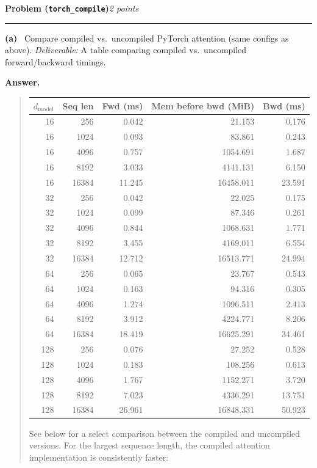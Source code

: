 \documentclass[11pt]{article}
\newcommand{\problem}[2]{%
  \vspace{0.6em}%
  \noindent\textbf{Problem (\texttt{#1})}\hfill\textit{#2 points}\par%
  \vspace{0.2em}\hrule\vspace{0.4em}%
}
\newcommand{\subq}[1]{\vspace{0.3em}\noindent\textbf{(#1)}\ }
\newcommand{\deliverable}[1]{\vspace{0.2em}\noindent\textit{Deliverable:} #1\par}
\newenvironment{answer}{%
  \vspace{0.3em}%
  \noindent\textbf{Answer.}\begin{quote}%
}{%
  \end{quote}\vspace{0.4em}%
}
\begin{document}
\problem{torch\_compile}{2}

\subq{a} Compare compiled vs.\ uncompiled PyTorch attention (same configs as above).
\deliverable{A table comparing compiled vs.\ uncompiled forward/backward timings.}
\begin{answer}
  \begin{center}
  \small
  \begin{tabular}{rrrrr}
    \toprule
    $d_{\text{model}}$ & Seq len & Fwd (ms) & Mem before bwd (MiB) & Bwd (ms) \\
    \midrule
    16 & 256 & 0.042 & 21.153 & 0.176 \\
    16 & 1024 & 0.093 & 83.861 & 0.243 \\
    16 & 4096 & 0.757 & 1054.691 & 1.687 \\
    16 & 8192 & 3.033 & 4141.131 & 6.150 \\
    16 & 16384 & 11.245 & 16458.011 & 23.591 \\
    32 & 256 & 0.042 & 22.025 & 0.175 \\
    32 & 1024 & 0.099 & 87.346 & 0.261 \\
    32 & 4096 & 0.844 & 1068.631 & 1.771 \\
    32 & 8192 & 3.455 & 4169.011 & 6.554 \\
    32 & 16384 & 12.712 & 16513.771 & 24.994 \\
    64 & 256 & 0.065 & 23.767 & 0.543 \\
    64 & 1024 & 0.163 & 94.316 & 0.305 \\
    64 & 4096 & 1.274 & 1096.511 & 2.413 \\
    64 & 8192 & 3.912 & 4224.771 & 8.206 \\
    64 & 16384 & 18.419 & 16625.291 & 34.461 \\
    128 & 256 & 0.076 & 27.252 & 0.528 \\
    128 & 1024 & 0.183 & 108.256 & 0.613 \\
    128 & 4096 & 1.767 & 1152.271 & 3.720 \\
    128 & 8192 & 7.023 & 4336.291 & 13.751 \\
    128 & 16384 & 26.961 & 16848.331 & 50.923 \\
    \bottomrule
  \end{tabular}
  \end{center}

  See below for a select comparison between the compiled and uncompiled versions.
  For the largest sequence length, the compiled attention implementation is consistently faster:


\end{answer}
\end{document}
